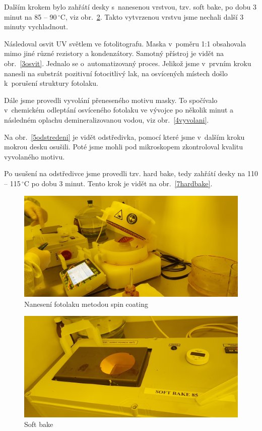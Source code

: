 \documentclass[a4paper,12pt]{article}
\begin{document}
Dalším krokem bylo zahřátí desky s~nanesenou vrstvou, tzv. soft bake, po dobu 3 
minut na 85 -- 90\,$^{\circ}$C, viz obr.~\ref{2bake}. Takto vytvrzenou vrstvu 
jsme nechali další 3 minuty vychladnout.

Následoval osvit UV světlem ve fotolitografu. Maska v~poměru 1:1 obsahovala 
mimo jiné různé rezistory a kondenzátory. Samotný přístroj je vidět na 
obr.~\ref{3osvit}. Jednalo se o~automatizovaný proces. Jelikož jsme v~prvním 
kroku 
nanesli na substrát pozitivní fotocitlivý lak, na osvícených místech došlo
k~porušení struktury fotolaku.

Dále jsme provedli vyvolání přeneseného motivu masky. To spočívalo v~chemickém 
odleptání osvíceného fotolaku ve vývojce po několik minut a následném oplachu 
demineralizovanou vodou, viz obr.~\ref{4vyvolani}. 

Na obr.~\ref{5odstredeni} je vidět odstředivka, pomocí které jsme v~dalším 
kroku mokrou desku osušili. Poté jsme mohli pod mikroskopem zkontroloval 
kvalitu vyvolaného motivu.

Po usušení na odstředivce jsme provedli tzv. hard bake, tedy zahřátí desky na 
110 -- 115\,$^{\circ}$C po dobu 3 minut. Tento krok je vidět na 
obr.~\ref{7hardbake}.

\newpage
\begin{figure}[h!]
	\centering
	\includegraphics[width=130mm]{1spincoating.jpg}
	\caption{Nanesení fotolaku metodou spin coating}
	\label{1spincoating}
\end{figure}

\begin{figure}[h!]
	\centering
	\includegraphics[width=130mm]{2bake.jpg}
	\caption{Soft bake}
	\label{2bake}
\end{figure}
\end{document}
